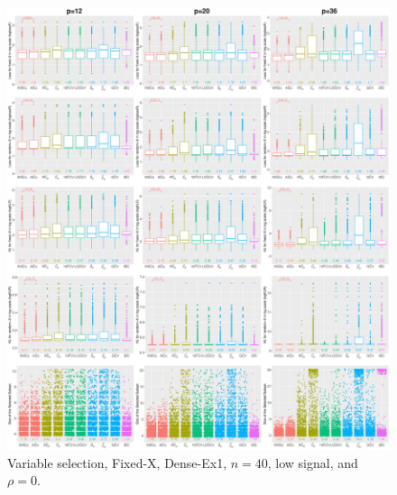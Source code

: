\begin{figure}[!ht]
\centering
\includegraphics[width=\textwidth]{figures/supplement/fixedx/subset_selection/Dense-Ex1_n40_lsnr_rho0.eps}
\caption{Variable selection, Fixed-X, Dense-Ex1, $n=40$, low signal, and $\rho=0$.}
\end{figure}
\clearpage
